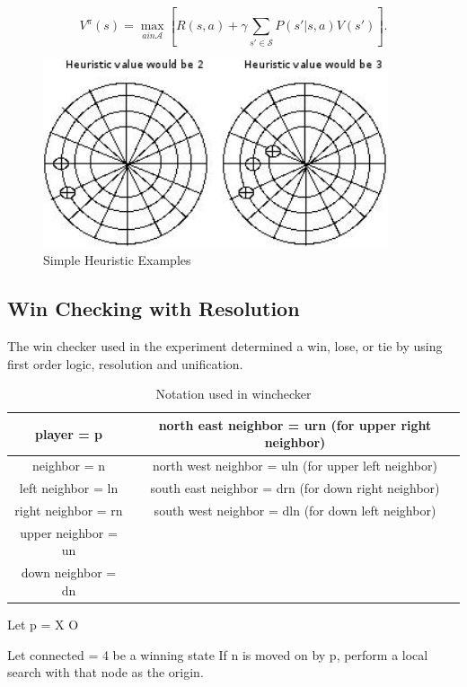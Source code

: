 \documentclass[12pt,letterpaper]{article}
\begin{document}
\[
V^\pi(s)=\max_{a in \mathcal{A}} \left[ R(s,a) + \gamma \sum_{s' \in \mathcal{S}} P(s'|s,a) V(s') \right].
\]

\begin{figure}
\begin{center}
\includegraphics[width=4in]{heu.png}
\end{center}
\caption{Simple Heuristic Examples}
\label{heuristicExample}
\end{figure}

\subsection{Win Checking with Resolution}
The win checker used in the experiment determined a win, lose, or tie by using first order logic, resolution and unification.

\begin{table}
\begin{center}
\begin{tabular}{|c||c|}
\hline
player = p & north east neighbor = urn 
(for upper right neighbor)\\
\hline 
neighbor = n & north west neighbor = uln
(for upper left neighbor)\\
\hline 
left neighbor = ln & south east neighbor = drn
(for down right neighbor)\\
\hline 
right neighbor = rn & south west neighbor = dln
(for down left neighbor)\\
\hline 
upper neighbor = un & \\
\hline 
down neighbor = dn & \\
\hline 
\end{tabular}
\end{center}
\caption{Notation used in winchecker}
\label{Notation}
\end{table}


Let p = X \bigoplus O

Let connected = 4 be a winning state If n is moved on by p, perform a local search with that node as the origin.
\end{document}
